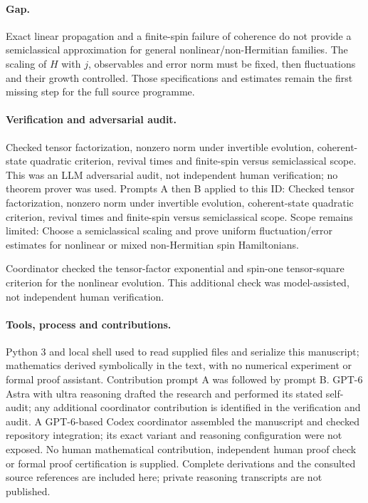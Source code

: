 \documentclass[11pt]{article}
\begin{document}
\paragraph{Gap.}Exact linear propagation and a finite-spin failure of coherence do not provide a semiclassical approximation for general nonlinear/non-Hermitian families. The scaling of \(H\) with \(j\), observables and error norm must be fixed, then fluctuations and their growth controlled. Those specifications and estimates remain the first missing step for the full source programme.

\paragraph{Verification and adversarial audit.}
Checked tensor factorization, nonzero norm under invertible evolution, coherent-state quadratic criterion, revival times and finite-spin versus semiclassical scope. This was an LLM adversarial audit, not independent human verification; no theorem prover was used. Prompts A then B applied to this ID: Checked tensor factorization, nonzero norm under invertible evolution, coherent-state quadratic criterion, revival times and finite-spin versus semiclassical scope. Scope remains limited: Choose a semiclassical scaling and prove uniform fluctuation/error estimates for nonlinear or mixed non-Hermitian spin Hamiltonians.

Coordinator checked the tensor-factor exponential and spin-one tensor-square criterion for the nonlinear evolution. This additional check was model-assisted, not independent human verification.

\paragraph{Tools, process and contributions.}
Python 3 and local shell used to read supplied files and serialize this manuscript; mathematics derived symbolically in the text, with no numerical experiment or formal proof assistant. Contribution prompt A was followed by prompt B. GPT-6 Astra with ultra reasoning drafted the research and performed its stated self-audit; any additional coordinator contribution is identified in the verification and audit. A GPT-6-based Codex coordinator assembled the manuscript and checked repository integration; its exact variant and reasoning configuration were not exposed. No human mathematical contribution, independent human proof check or formal proof certification is supplied. Complete derivations and the consulted source references are included here; private reasoning transcripts are not published.
\end{document}
